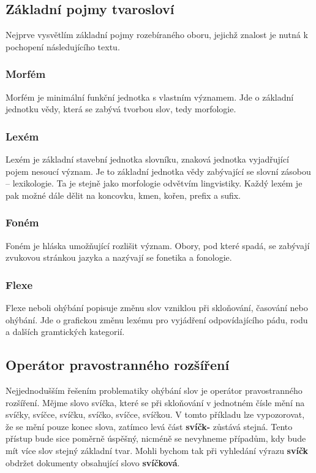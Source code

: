 \documentclass[FM,DP]{tulthesis}
\begin{document}
\subsection{Základní pojmy tvarosloví}

Nejprve vysvětlím základní pojmy rozebíraného oboru, jejichž znalost je nutná k pochopení 
následujícího textu.

\subsubsection*{Morfém}

Morfém je minimální funkční jednotka s vlastním významem. Jde o základní jednotku vědy, 
která se zabývá tvorbou slov, tedy morfologie.

\subsubsection*{Lexém}

Lexém je základní stavební jednotka slovníku, znaková jednotka vyjadřující pojem nesoucí
význam. Je to základní jednotka vědy zabývající se slovní zásobou -- lexikologie. Ta je stejně 
jako morfologie odvětvím lingvistiky. Každý lexém je pak možné dále dělit na koncovku, 
kmen, kořen, prefix a sufix.

\subsubsection*{Foném}

Foném je hláska umožňující rozlišit význam. Obory, pod které spadá, se zabývají zvukovou
stránkou jazyka a nazývají se fonetika a fonologie.

\subsubsection*{Flexe}

Flexe neboli ohýbání popisuje změnu slov vzniklou při skloňování, časování nebo ohýbání.
Jde o grafickou změnu lexému pro vyjádření odpovídajícího pádu, rodu a dalších gramtických
kategorií.

\subsection{Operátor pravostranného rozšíření}

Nejjednodušším řešením problematiky ohýbání slov je operátor pravostranného rozšíření.
Mějme slovo svíčka, které se při skloňování v jednotném čísle mění na svíčky, svíčce, 
svíčku, svíčko, svíčce, svíčkou. V tomto příkladu lze vypozorovat, že se mění
pouze konec slova, zatímco levá část \textbf{svíčk-} zůstává stejná. Tento přístup bude 
sice poměrně úspěšný, nicméně se nevyhneme případům, kdy bude mít více slov stejný
základní tvar. Mohli bychom tak při vyhledání výrazu \textbf{svíčk} obdržet dokumenty
obsahující slovo \textbf{svíčková}.
\end{document}
